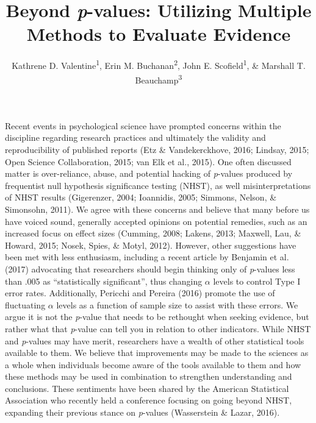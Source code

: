 \documentclass[english,man]{apa6}
\title{Beyond \emph{p}-values: Utilizing Multiple Methods to Evaluate Evidence}
\author{Kathrene D. Valentine\textsuperscript{1}, Erin M. Buchanan\textsuperscript{2}, John E. Scofield\textsuperscript{1}, \& Marshall T. Beauchamp\textsuperscript{3}}
\affiliation{
    \vspace{0.5cm}
          \textsuperscript{1} University of Missouri\\
          \textsuperscript{2} Missouri State University\\
          \textsuperscript{3} University of Missouri - Kansas City  }
\theoremstyle{definition}
\theoremstyle{definition}
\theoremstyle{definition}
\theoremstyle{remark}
\begin{document}
\maketitle

\setcounter{secnumdepth}{0}



Recent events in psychological science have prompted concerns within the
discipline regarding research practices and ultimately the validity and
reproducibility of published reports (Etz \& Vandekerckhove, 2016;
Lindsay, 2015; Open Science Collaboration, 2015; van Elk et al., 2015).
One often discussed matter is over-reliance, abuse, and potential
hacking of \emph{p}-values produced by frequentist null hypothesis
significance testing (NHST), as well misinterpretations of NHST results
(Gigerenzer, 2004; Ioannidis, 2005; Simmons, Nelson, \& Simonsohn,
2011). We agree with these concerns and believe that many before us have
voiced sound, generally accepted opinions on potential remedies, such as
an increased focus on effect sizes (Cumming, 2008; Lakens, 2013;
Maxwell, Lau, \& Howard, 2015; Nosek, Spies, \& Motyl, 2012). However,
other suggestions have been met with less enthusiasm, including a recent
article by Benjamin et al. (2017) advocating that researchers should
begin thinking only of \emph{p}-values less than .005 as
\enquote{statistically significant}, thus changing \(\alpha\) levels to
control Type I error rates. Additionally, Pericchi and Pereira (2016)
promote the use of fluctuating \(\alpha\) levels as a function of sample
size to assist with these errors. We argue it is not the \emph{p}-value
that needs to be rethought when seeking evidence, but rather what that
\emph{p}-value can tell you in relation to other indicators. While NHST
and \emph{p}-values may have merit, researchers have a wealth of other
statistical tools available to them. We believe that improvements may be
made to the sciences as a whole when individuals become aware of the
tools available to them and how these methods may be used in combination
to strengthen understanding and conclusions. These sentiments have been
shared by the American Statistical Association who recently held a
conference focusing on going beyond NHST, expanding their previous
stance on \emph{p}-values (Wasserstein \& Lazar, 2016).
\end{document}
